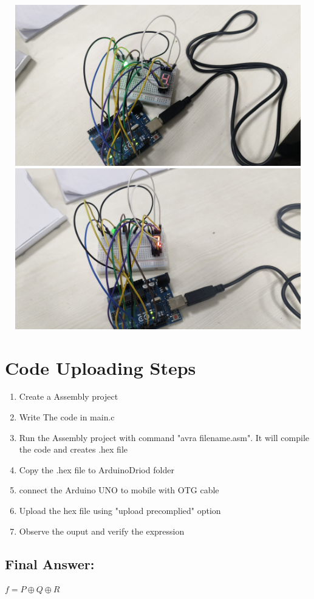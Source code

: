 \documentclass[a4paper,12pt]{article}
\begin{document}
\newpage
\begin{center}
        \includegraphics[width=14cm, height=7cm]{output.jpg}\vspace{0.5cm}
\includegraphics[width=14cm, height=7cm]{output1.jpg}
\end{center}
\section*{Code Uploading Steps}
\begin{enumerate}
	\item Create a Assembly  project
	\item Write The code in main.c
	\item Run the Assembly project with command "avra filename.asm". It will compile the code and creates .hex file
	\item Copy the .hex file to ArduinoDriod folder
	\item connect the Arduino UNO to mobile with OTG cable
	\item Upload the hex file using "upload precomplied" option
	\item Observe the ouput and verify the expression
\end{enumerate}
\subsection*{Final Answer:}

$
\boxed{f = P \oplus Q \oplus R}
$
\end{document}
